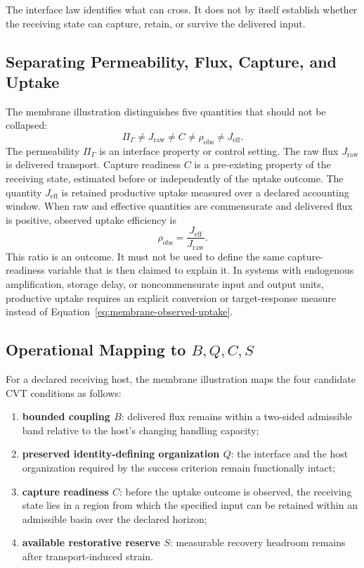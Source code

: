 The interface law identifies what can cross. It does not by itself establish whether the receiving state can capture, retain, or survive the delivered input.

\subsection{Separating Permeability, Flux, Capture, and Uptake}

The membrane illustration distinguishes five quantities that should not be collapsed:
\begin{equation}
    \Pi_{\Gamma}
    \neq
    J_{\mathrm{raw}}
    \neq
    C
    \neq
    \rho_{\mathrm{obs}}
    \neq
    J_{\mathrm{eff}}.
    \label{eq:membrane-separation}
\end{equation}
The permeability \(\Pi_{\Gamma}\) is an interface property or control setting. The raw flux \(J_{\mathrm{raw}}\) is delivered transport. Capture readiness \(C\) is a pre-existing property of the receiving state, estimated before or independently of the uptake outcome. The quantity \(J_{\mathrm{eff}}\) is retained productive uptake measured over a declared accounting window. When raw and effective quantities are commensurate and delivered flux is positive, observed uptake efficiency is
\begin{equation}
    \rho_{\mathrm{obs}}
    =
    \frac{J_{\mathrm{eff}}}{J_{\mathrm{raw}}}.
    \label{eq:membrane-observed-uptake}
\end{equation}
This ratio is an outcome. It must not be used to define the same capture-readiness variable that is then claimed to explain it. In systems with endogenous amplification, storage delay, or noncommensurate input and output units, productive uptake requires an explicit conversion or target-response measure instead of Equation~\eqref{eq:membrane-observed-uptake}.

\subsection{Operational Mapping to \(B,Q,C,S\)}

For a declared receiving host, the membrane illustration maps the four candidate CVT conditions as follows:
\begin{enumerate}[label=(\roman*)]
    \item \textbf{bounded coupling \(B\)}: delivered flux remains within a two-sided admissible band relative to the host's changing handling capacity;
    \item \textbf{preserved identity-defining organization \(Q\)}: the interface and the host organization required by the success criterion remain functionally intact;
    \item \textbf{capture readiness \(C\)}: before the uptake outcome is observed, the receiving state lies in a region from which the specified input can be retained within an admissible basin over the declared horizon;
    \item \textbf{available restorative reserve \(S\)}: measurable recovery headroom remains after transport-induced strain.
\end{enumerate}

